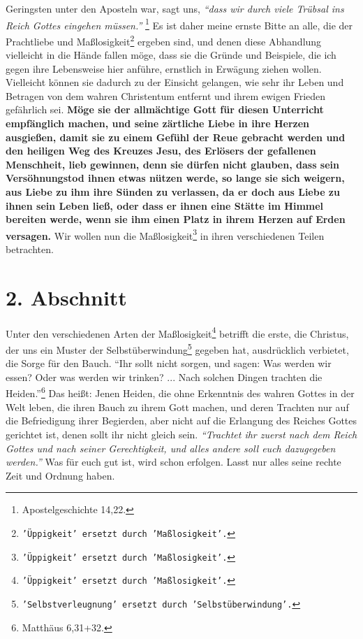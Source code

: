 Geringsten unter den Aposteln war, sagt uns,
\textit{"`dass wir durch viele Trübsal ins
Reich Gottes eingehen müssen."'}
\footnote{Apostelgeschichte 14,22.}
Es ist daher meine
ernste Bitte an alle, die der Prachtliebe und
Maßlosigkeit\footnote{\texttt{'Üppigkeit' ersetzt durch
'Maßlosigkeit'.}} ergeben sind, und
denen diese Abhandlung vielleicht in die Hände fallen möge, dass sie die Gründe
und Beispiele, die ich gegen ihre Lebensweise hier anführe, ernstlich in
Erwägung ziehen wollen. Vielleicht können sie dadurch zu der Einsicht gelangen,
wie sehr ihr Leben und Betragen von dem wahren
Christentum entfernt
und ihrem
ewigen Frieden gefährlich sei.
\label{ref:14_01_wahre_nachfolger_suenetod}
\textbf{Möge sie der allmächtige Gott für diesen
Unterricht empfänglich machen, und seine zärtliche Liebe in ihre Herzen
ausgießen, damit sie zu einem Gefühl der Reue gebracht werden
und den heiligen
Weg des Kreuzes Jesu, des Erlösers der
gefallenen
Menschheit, lieb gewinnen,
denn sie dürfen nicht glauben, dass sein Versöhnungstod
ihnen etwas nützen werde,
so lange sie sich weigern, aus Liebe zu ihm ihre Sünden zu
verlassen, da er doch
aus Liebe zu ihnen sein Leben ließ, oder dass er ihnen eine Stätte im Himmel
bereiten werde, wenn sie ihm einen Platz in ihrem Herzen auf Erden versagen.}
Wir
wollen nun die Maßlosigkeit\footnote{\texttt{'Üppigkeit' ersetzt durch
'Maßlosigkeit'.}}
in ihren verschiedenen Teilen betrachten.

\section{2. Abschnitt} \label{kap14_ab2}

Unter den verschiedenen Arten der Maßlosigkeit\footnote{\texttt{'Üppigkeit'
ersetzt durch 'Maßlosigkeit'.}} betrifft die erste, die Christus,
der uns ein Muster der Selbstüberwindung\footnote{\texttt{'Selbstverleugnung'
ersetzt durch 'Selbstüberwindung'.}} gegeben hat, ausdrücklich verbietet,
die Sorge für den Bauch.
"`Ihr sollt nicht sorgen, und sagen: Was werden wir
essen? Oder was werden wir trinken? ... Nach solchen Dingen trachten die
Heiden."'\footnote{Matthäus 6,31+32.}
Das heißt: Jenen Heiden, die ohne
Erkenntnis des wahren Gottes in der Welt leben, die ihren
Bauch zu ihrem Gott
machen, und deren Trachten nur auf die Befriedigung ihrer
Begierden, aber nicht
auf die Erlangung des Reiches Gottes gerichtet ist, denen
sollt ihr nicht gleich
sein.
\textit{"`Trachtet ihr zuerst nach dem Reich Gottes und nach seiner
Gerechtigkeit, und alles andere soll euch dazugegeben werden."'} Was für euch
gut
ist, wird schon erfolgen. Lasst nur alles seine rechte Zeit
und Ordnung haben.

